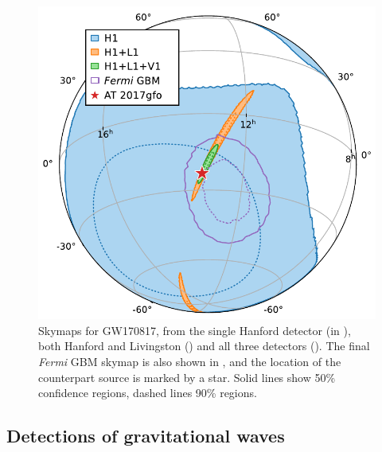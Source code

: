 \begin{colsection}
\begin{colsection}
\begin{figure}[p]
    \begin{center}
        \includegraphics[width=\linewidth]{images/skymaps.pdf}
    \end{center}
    \caption[Skymaps for GW170817]{
        Skymaps for GW170817, from the single Hanford detector (in ), both Hanford and Livingston () and all three detectors (). The final \textit{Fermi} GBM skymap is also shown in , and the location of the counterpart source is marked by a  star. Solid lines show 50\% confidence regions, dashed lines 90\% regions.
        }\label{fig:170817_skymaps}
\end{figure}

\end{colsection}

\newpage
\subsection{Detections of gravitational waves}
\label{sec:gw_detections}
\begin{colsection}


\end{colsection}


\end{colsection}

